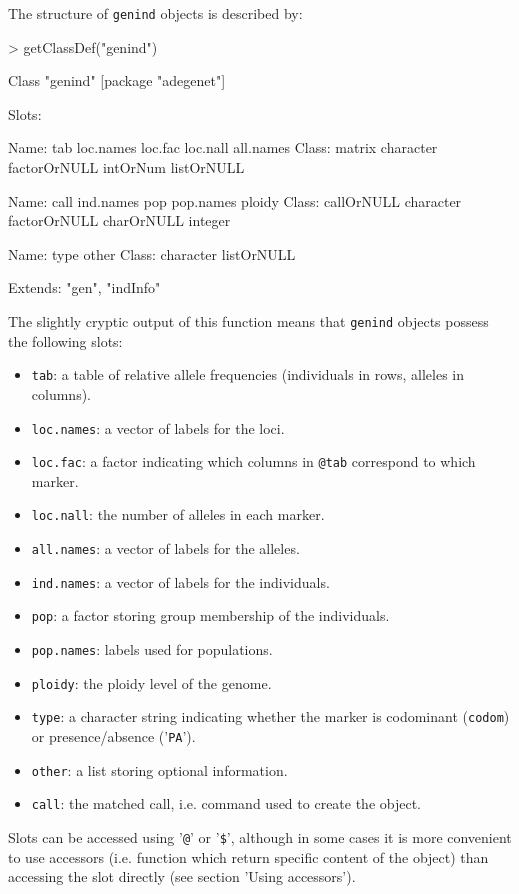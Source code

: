 \documentclass{article}
\begin{document}
The structure of \texttt{genind} objects is described by:
\begin{Schunk}
\begin{Sinput}
> getClassDef("genind")
\end{Sinput}
\begin{Soutput}
Class "genind" [package "adegenet"]

Slots:
                                                                       
Name:           tab    loc.names      loc.fac     loc.nall    all.names
Class:       matrix    character factorOrNULL     intOrNum   listOrNULL
                                                                       
Name:          call    ind.names          pop    pop.names       ploidy
Class:   callOrNULL    character factorOrNULL   charOrNULL      integer
                                
Name:          type        other
Class:    character   listOrNULL

Extends: "gen", "indInfo"
\end{Soutput}
\end{Schunk}

The slightly cryptic output of this function means that \texttt{genind} objects possess the following slots:
\begin{itemize}
  \item \texttt{tab}: a table of relative allele frequencies (individuals in rows, alleles in columns).
  \item \texttt{loc.names}: a vector of labels for the loci.
  \item \texttt{loc.fac}: a factor indicating which columns in \texttt{@tab} correspond to which marker.
  \item \texttt{loc.nall}: the number of alleles in each marker.
  \item \texttt{all.names}: a vector of labels for the alleles.
  \item \texttt{ind.names}:  a vector of labels for the individuals.
  \item \texttt{pop}: a factor storing group membership of the individuals.
  \item \texttt{pop.names}: labels used for populations.
  \item \texttt{ploidy}: the ploidy level of the genome.
  \item \texttt{type}: a character string indicating whether the marker is codominant
    (\texttt{codom}) or presence/absence ('\texttt{PA}').
  \item \texttt{other}: a list storing optional information.
  \item \texttt{call}: the matched call, i.e. command used to create the object.
\end{itemize}
Slots can be accessed using '\texttt{@}' or '\texttt{\$}', although in some cases it is more
convenient to use accessors (i.e. function which return specific content of the object) than
accessing the slot directly (see section 'Using accessors').
\\
\end{document}
